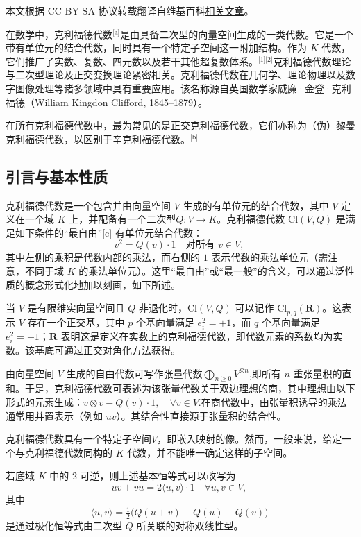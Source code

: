 
本文根据 CC-BY-SA 协议转载翻译自维基百科\href{https://en.wikipedia.org/wiki/Clifford_algebra}{相关文章}。

在数学中，克利福德代数\(^\text{[a]}\)是由具备二次型的向量空间生成的一类代数。它是一个带有单位元的结合代数，同时具有一个特定子空间这一附加结构。作为 $K$-代数，它们推广了实数、复数、四元数以及若干其他超复数体系。\(^\text{[1][2]}\)克利福德代数理论与二次型理论及正交变换理论紧密相关。克利福德代数在几何学、理论物理以及数字图像处理等诸多领域中具有重要应用。该名称源自英国数学家威廉·金登·克利福德（William Kingdon Clifford, 1845–1879）。

在所有克利福德代数中，最为常见的是正交克利福德代数，它们亦称为（伪）黎曼克利福德代数，以区别于辛克利福德代数。\(^\text{[b]}\)
\subsection{引言与基本性质}
克利福德代数是一个包含并由向量空间 $V$ 生成的有单位元的结合代数，其中 $V$ 定义在一个域 $K$ 上，并配备有一个二次型$Q: V \to K$。克利福德代数 $\mathrm{Cl}(V, Q)$ 是满足如下条件的“最自由”[c] 有单位元结合代数：
$$
v^{2} = Q(v) \cdot 1 \quad \text{对所有 } v \in V,~
$$
其中左侧的乘积是代数内部的乘法，而右侧的 $1$ 表示代数的乘法单位元（需注意，不同于域 $K$ 的乘法单位元）。这里“最自由”或“最一般”的含义，可以通过泛性质的概念形式化地加以刻画，如下所述。

当 $V$ 是有限维实向量空间且 $Q$ 非退化时，$\mathrm{Cl}(V, Q)$ 可以记作 $\mathrm{Cl}_{p,q}(\mathbf{R})$。这表示 $V$ 存在一个正交基，其中 $p$ 个基向量满足 $e_i^2 = +1$，而 $q$ 个基向量满足 $e_i^2 = -1$；$\mathbf{R}$ 表明这是定义在实数上的克利福德代数，即代数元素的系数均为实数。该基底可通过正交对角化方法获得。

由向量空间 $V$ 生成的自由代数可写作张量代数$\bigoplus_{n \geq 0} V^{\otimes n}$,即所有 $n$ 重张量积的直和。于是，克利福德代数可表述为该张量代数关于双边理想的商，其中理想由以下形式的元素生成：$v \otimes v - Q(v) \cdot 1, \quad \forall v \in V$.在商代数中，由张量积诱导的乘法通常用并置表示（例如 $uv$）。其结合性直接源于张量积的结合性。

克利福德代数具有一个特定子空间$V$，即嵌入映射的像。然而，一般来说，给定一个与克利福德代数同构的 $K$-代数，并不能唯一确定这样的子空间。

若底域 $K$ 中的 2 可逆，则上述基本恒等式可以改写为
$$
uv + vu = 2 \langle u, v \rangle \cdot 1 \quad \forall u, v \in V,~
$$
其中
$$
\langle u, v \rangle = \tfrac{1}{2}\big(Q(u+v) - Q(u) - Q(v)\big)~
$$
是通过极化恒等式由二次型 $Q$ 所关联的对称双线性型。

